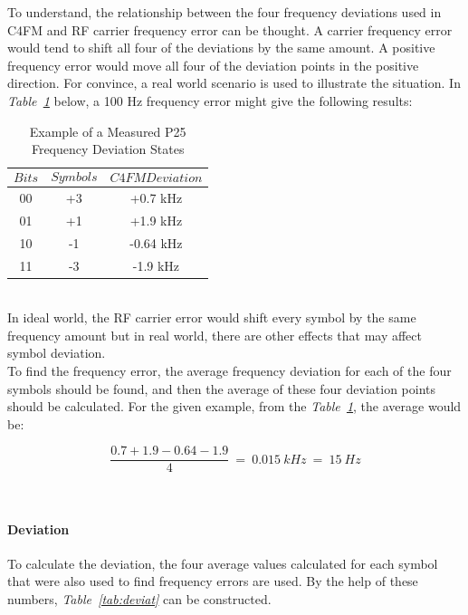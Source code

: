 	To understand, the relationship between the four frequency deviations used in C4FM and RF carrier frequency error can be thought. A carrier frequency error would tend to shift all four of the deviations by the same amount. A positive frequency error would move all four of the deviation points in the positive direction. For convince, a real world scenario is used to illustrate the situation. In \textit{Table~\ref{tab:modfide2}} below, a 100 Hz frequency error might give the following results:


\begin{table}[H]
  \centering
 	\caption{Example of a Measured P25 Frequency Deviation
States}
    \begin{tabular}{c|c|c}
       $$Bits$$ & $$Symbols$$ & $$C4FM Deviation$$ \\ \hline
       00 & +3 & +0.7 kHz  \\ \hline
       01 & +1 & +1.9 kHz  \\ \hline
       10 & -1 & -0.64 kHz  \\ \hline
       11 & -3 & -1.9 kHz  
      
  \end{tabular}
  
  \label{tab:modfide2}
\end{table}

\- \\




	In ideal world, the RF carrier error would shift every symbol by the same frequency amount but in real world, there are other effects that may affect symbol deviation.\\
	
	To find the frequency error, the average frequency deviation for each of the four symbols should be found, and then the average of these four deviation points should be calculated. For the given example, from the \textit{Table~\ref{tab:modfide2}}, the average would be:
	
	$$	\frac{0.7+1.9-0.64-1.9}{4}~=~0.015~kHz~=~15~Hz	$$

\- \\
\paragraph*{Deviation} 
\- \indent
	To calculate the deviation, the four average values calculated for each symbol that were also used to find frequency errors are used. By the help of these numbers, \textit{Table~\ref{tab:deviat}} can be constructed.

